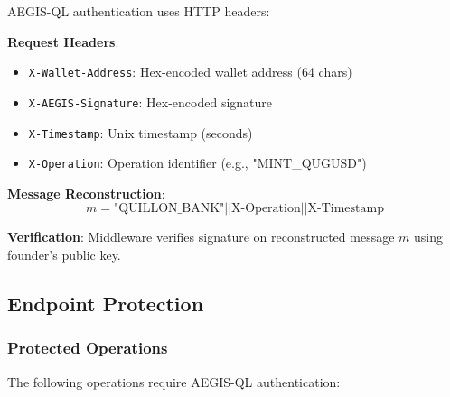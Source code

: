 \documentclass[11pt,a4paper]{article}
\begin{document}
AEGIS-QL authentication uses HTTP headers:

\begin{tcolorbox}[colback=codebg,colframe=black!30]
\textbf{Request Headers}:
\begin{itemize}[leftmargin=*,nosep]
    \item \texttt{X-Wallet-Address}: Hex-encoded wallet address (64 chars)
    \item \texttt{X-AEGIS-Signature}: Hex-encoded signature
    \item \texttt{X-Timestamp}: Unix timestamp (seconds)
    \item \texttt{X-Operation}: Operation identifier (e.g., "MINT\_QUGUSD")
\end{itemize}
\end{tcolorbox}

\textbf{Message Reconstruction}:
$$m = \text{"QUILLON\_BANK"} || \text{X-Operation} || \text{X-Timestamp}$$

\textbf{Verification}: Middleware verifies signature on reconstructed message $m$ using founder's public key.

\subsection{Endpoint Protection}

\subsubsection{Protected Operations}

The following operations require AEGIS-QL authentication:
\end{document}
